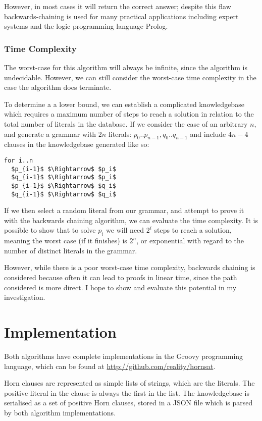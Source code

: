 \documentclass{article}
\begin{document}
However, in most cases it will return the correct answer; despite this flaw
backwards-chaining is used for many practical applications including expert
systems and  the logic programming language Prolog\cite{prolog}.

\subsubsection{Time Complexity}

The worst-case for this algorithm will always be infinite, since the algorithm
is undecidable. However, we can still consider the worst-case time complexity 
in the case the algorithm does terminate. 

To determine a a lower bound, we can establish a complicated knowledgebase which 
requires a maximum number of steps to reach a solution in relation to the total number
of literals in the database. If we consider the case of an arbitrary $n$, and generate a grammar 
with $2n$ literals: $p_0 .. p_{n-1}, q_0 .. q_{n-1}$ and include $4n-4$ clauses in the knowledgebase
generated like so:

\begin{lstlisting}[mathescape=true]
for i..n
  $p_{i-1}$ $\Rightarrow$ $p_i$
  $q_{i-1}$ $\Rightarrow$ $p_i$
  $p_{i-1}$ $\Rightarrow$ $q_i$
  $q_{i-1}$ $\Rightarrow$ $q_i$
\end{lstlisting}

If we then select a random literal from our grammar, and attempt to prove it
with the backwards chaining algorithm, we can evaluate the time complexity. 
It is possible to show that to solve $p_i$ we will need $2^i$ 
steps to reach a solution, meaning the worst case (if it finishes) is $2^n$, or
exponential with regard to the number of distinct literals in the grammar.

However, while there is a poor worst-case time complexity, backwards chaining is
considered because often it can lead to proofs in linear time, since the
path considered is more direct. I hope to show and evaluate this potential
in my investigation.

\section{Implementation}

Both algorithms have complete implementations in the Groovy programming
language, which can be found at \url{http://github.com/reality/hornsat}.

Horn clauses are represented as simple lists of strings, which are the 
literals. The positive literal in the clause is always the first in the 
list. The knowledgebase is serialised as a set of positive Horn clauses, 
stored in a JSON file which is parsed by both algorithm implementations.
\end{document}
